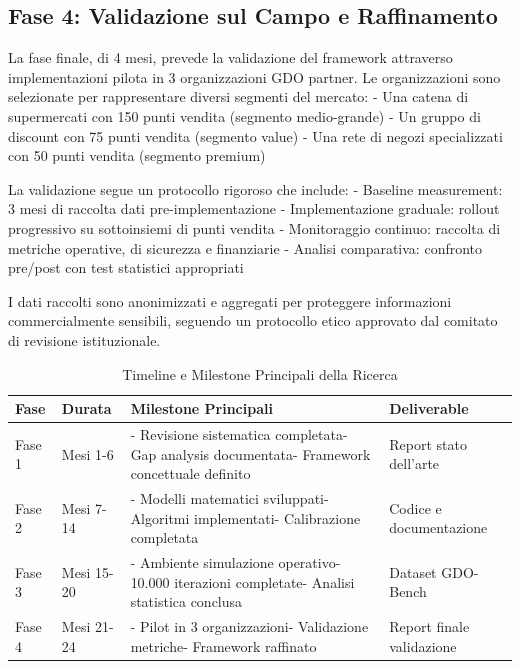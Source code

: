 \subsection{Fase 4: Validazione sul Campo e Raffinamento}

La fase finale, di 4 mesi, prevede la validazione del framework attraverso implementazioni pilota in 3 organizzazioni GDO partner. Le organizzazioni sono selezionate per rappresentare diversi segmenti del mercato:
- Una catena di supermercati con 150 punti vendita (segmento medio-grande)
- Un gruppo di discount con 75 punti vendita (segmento value)
- Una rete di negozi specializzati con 50 punti vendita (segmento premium)

La validazione segue un protocollo rigoroso che include:
- Baseline measurement: 3 mesi di raccolta dati pre-implementazione
- Implementazione graduale: rollout progressivo su sottoinsiemi di punti vendita
- Monitoraggio continuo: raccolta di metriche operative, di sicurezza e finanziarie
- Analisi comparativa: confronto pre/post con test statistici appropriati

I dati raccolti sono anonimizzati e aggregati per proteggere informazioni commercialmente sensibili, seguendo un protocollo etico approvato dal comitato di revisione istituzionale.

\begin{table}[htbp]
\centering
\caption{Timeline e Milestone Principali della Ricerca}
\label{tab:timeline_ricerca}
\begin{tabular}{|l|l|p{6cm}|l|}
\hline
\textbf{Fase} & \textbf{Durata} & \textbf{Milestone Principali} & \textbf{Deliverable} \\
\hline
Fase 1 & Mesi 1-6 & - Revisione sistematica completata\newline- Gap analysis documentata\newline- Framework concettuale definito & Report stato dell'arte \\
\hline
Fase 2 & Mesi 7-14 & - Modelli matematici sviluppati\newline- Algoritmi implementati\newline- Calibrazione completata & Codice e documentazione \\
\hline
Fase 3 & Mesi 15-20 & - Ambiente simulazione operativo\newline- 10.000 iterazioni completate\newline- Analisi statistica conclusa & Dataset GDO-Bench \\
\hline
Fase 4 & Mesi 21-24 & - Pilot in 3 organizzazioni\newline- Validazione metriche\newline- Framework raffinato & Report finale validazione \\
\hline
\end{tabular}
\end{table}

